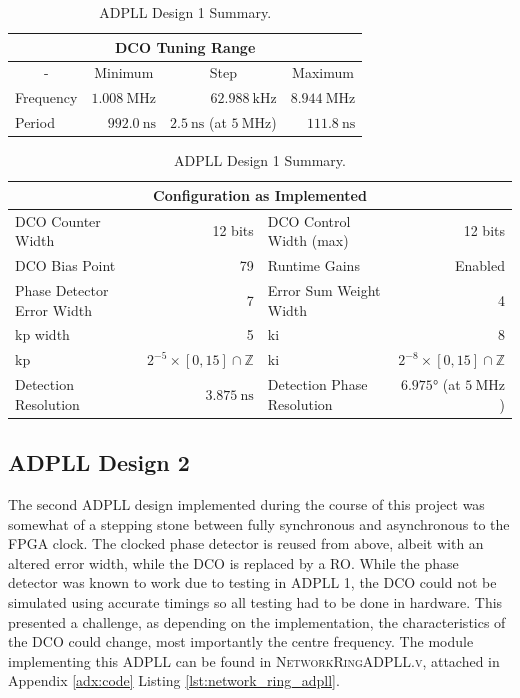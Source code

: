 \begin{table}[!h]
    \begin{center}
        \begin{tabular}{|l|r|r|r|}
            \multicolumn{4}{c}{\ac{DCO} Tuning Range} \T\\
            \hline
            \multicolumn{1}{|c|}{-} & \multicolumn{1}{c|}{Minimum} & \multicolumn{1}{c|}{Step} & \multicolumn{1}{c|}{Maximum} \T\\
            \hline
            Frequency & $1.008~\si{\mega\hertz}$ & \multicolumn{1}{r|}{$62.988~\si{\kilo\hertz}$} & $8.944~\si{\mega\hertz}$ \T\\
            \hline
            Period & $992.0~\si{\nano\second}$ & \multicolumn{1}{r|}{$2.5~\si{\nano\second}$ (at $5~\si{\mega\hertz}$)} & $111.8~\si{\nano\second}$ \T\\
            \hline
        \end{tabular}
        \begin{tabular}{|l|r|l|r|}
            \multicolumn{4}{c}{Configuration as Implemented} \T\\
            \hline
            \ac{DCO} Counter Width & 12 bits & \ac{DCO} Control Width (max) & 12 bits \T\\
            \hline
            \ac{DCO} Bias Point & 79 & Runtime Gains & Enabled \T\\
            \hline
            Phase Detector Error Width & 7 & Error Sum Weight Width & 4 \T\\
            \hline
            \acs{kp} width & 5 & \acs{ki} & 8 \T\\
            \hline
            \acs{kp} & $2^{-5}\times[0,15]\cap\mathbb{Z}$ & \acs{ki} & $2^{-8}\times[0,15]\cap\mathbb{Z}$ \T\\
            \hline
            Detection Resolution & $3.875~\si{\nano\second}$ & Detection Phase Resolution & $6.975\si{\degree}$ (at $5~\si{\mega\hertz}$)\\
            \hline
        \end{tabular}
    \end{center}
\caption[ADPLL Design 1 Summary]{ADPLL Design 1 Summary.}
\label{table:adpll1}
\end{table}

\subsection{\acs{ADPLL} Design 2}
The second \ac{ADPLL} design implemented during the course of this project was somewhat of a stepping stone between fully synchronous and asynchronous to the \ac{FPGA} clock. The clocked phase detector is reused from above, albeit with an altered error width, while the \ac{DCO} is replaced by a \acl{RO}. While the phase detector was known to work due to testing in \ac{ADPLL} 1, the \ac{DCO} could not be simulated using accurate timings so all testing had to be done in hardware. This presented a challenge, as depending on the implementation, the characteristics of the \ac{DCO} could change, most importantly the centre frequency. The module implementing this \ac{ADPLL} can be found in \textsc{NetworkRingADPLL.v}, attached in Appendix \ref{adx:code} Listing \ref{lst:network_ring_adpll}.

